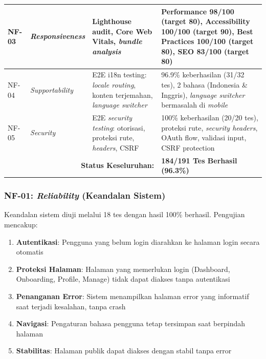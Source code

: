 \begin{longtable}{|p{}|p{}|p{}|p{}|}
	\hline
	NF-03                                              & \textit{Responsiveness}                & Lighthouse audit, Core Web Vitals, \textit{bundle analysis}                                & Performance 98/100 (target 80), Accessibility 100/100 (target 90), Best Practices 100/100 (target 80), SEO 83/100 (target 80)                 \\
	\hline
	NF-04                                              & \textit{Supportability}                & E2E i18n testing: \textit{locale routing}, konten terjemahan, \textit{language switcher}   & 96.9\% keberhasilan (31/32 tes), 2 bahasa (Indonesia \& Inggris), \textit{language switcher} bermasalah di \textit{mobile}                    \\
	\hline
	NF-05                                              & \textit{Security}                      & E2E \textit{security testing}: otorisasi, proteksi rute, \textit{headers}, CSRF            & 100\% keberhasilan (20/20 tes), proteksi rute, \textit{security headers}, OAuth flow, validasi input, CSRF protection                         \\
	\hline
	\multicolumn{3}{|r|}{\textbf{Status Keseluruhan:}} & \textbf{184/191 Tes Berhasil (96.3\%)}                                                                                                                                                                                                                                              \\
	\hline
\end{longtable}

\subsubsection{NF-01: \textit{Reliability} (Keandalan Sistem)}

Keandalan sistem diuji melalui 18 tes dengan hasil 100\% berhasil. Pengujian mencakup:

\begin{enumerate}
	\item \textbf{Autentikasi}: Pengguna yang belum login diarahkan ke halaman login secara otomatis
	\item \textbf{Proteksi Halaman}: Halaman yang memerlukan login (Dashboard, Onboarding, Profile, Manage) tidak dapat diakses tanpa autentikasi
	\item \textbf{Penanganan Error}: Sistem menampilkan halaman error yang informatif saat terjadi kesalahan, tanpa crash
	\item \textbf{Navigasi}: Pengaturan bahasa pengguna tetap tersimpan saat berpindah halaman
	\item \textbf{Stabilitas}: Halaman publik dapat diakses dengan stabil tanpa error
\end{enumerate}

